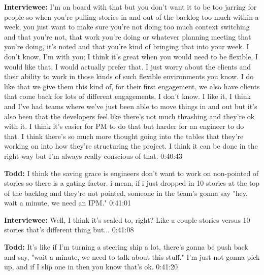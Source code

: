 \textbf{Interviewee:} I'm on board with that but you don't want it to be too jarring for people so when you're pulling stories in and out of the backlog too much within a week, you just want to make sure you're not doing too much context switching and that you're not, that work you're doing or whatever planning meeting that you're doing, it's noted and that you're kind of bringing that into your week. I don't know, I'm with you; I think it's great when you would need to be flexible, I would like that, I would actually prefer that. I just worry about the clients and their ability to work in those kinds of such flexible environments you know.  I do like that we give them this kind of, for their first engagement, we also have clients that come back for lots of different engagements, I don't know. I like it, I think and I've had teams where we've just been able to move things in and out but it's also been that the developers feel like there's not much thrashing and they're ok with it. I think it's easier for PM to do that but harder for an engineer to do that.  I think there's so much more thought going into the tables that they're working on into how they're structuring the project. I think it can be done in the right way but I'm always really conscious of that.   0:40:43

\textbf{Todd:} I think the saving grace is engineers don't want to work on non-pointed of stories so there is a gating factor. i mean, if i just dropped in 10 stories at the top of the backlog and they're not pointed, someone in the team's gonna say "hey, wait a minute, we need an IPM."   0:41:01

\textbf{Interviewee:} Well, I think it's scaled to, right?  Like a couple stories versus 10 stories that's different thing but...   0:41:08

\textbf{Todd:} It's like if I'm turning a steering ship a lot, there's gonna be push back and say, "wait a minute, we need to talk about this stuff."  I'm just not gonna pick up, and if I slip one in then you know that's ok.   0:41:20


